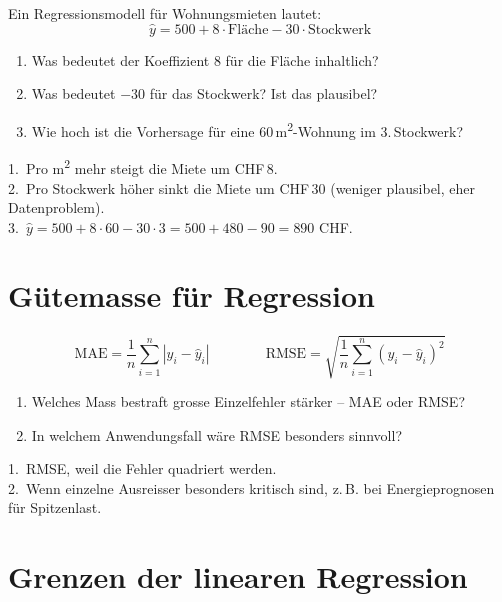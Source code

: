 \begin{myexercise}
Ein Regressionsmodell für Wohnungsmieten lautet:
\[
\hat{y} = 500 + 8 \cdot \text{Fläche} - 30 \cdot \text{Stockwerk}
\]
\begin{enumerate}
    \item Was bedeutet der Koeffizient $8$ für die Fläche inhaltlich?
    \item Was bedeutet $-30$ für das Stockwerk? Ist das plausibel?
    \item Wie hoch ist die Vorhersage für eine 60\,m\textsuperscript{2}-Wohnung im 3.\,Stockwerk?
\end{enumerate}
\begin{myanswer}
1.\ Pro m\textsuperscript{2} mehr steigt die Miete um CHF\,8. \\
2.\ Pro Stockwerk höher sinkt die Miete um CHF\,30 (weniger plausibel, eher Datenproblem). \\
3.\ $\hat{y} = 500 + 8 \cdot 60 - 30 \cdot 3 = 500 + 480 - 90 = 890$ CHF.
\end{myanswer}
\end{myexercise}

\section{Gütemasse für Regression}

\begin{mydefinition}
\[
\text{MAE} = \frac{1}{n}\sum_{i=1}^{n} |y_i - \hat{y}_i|
\qquad\qquad
\text{RMSE} = \sqrt{\frac{1}{n}\sum_{i=1}^{n} (y_i - \hat{y}_i)^2}
\]
\end{mydefinition}

\begin{myexercise}
\begin{enumerate}
    \item Welches Mass bestraft grosse Einzelfehler stärker -- MAE oder RMSE?
    \item In welchem Anwendungsfall wäre RMSE besonders sinnvoll?
\end{enumerate}
\begin{myanswer}
1.\ RMSE, weil die Fehler quadriert werden. \\
2.\ Wenn einzelne Ausreisser besonders kritisch sind, z.\,B. bei Energieprognosen für Spitzenlast.
\end{myanswer}
\end{myexercise}

\section{Grenzen der linearen Regression}

